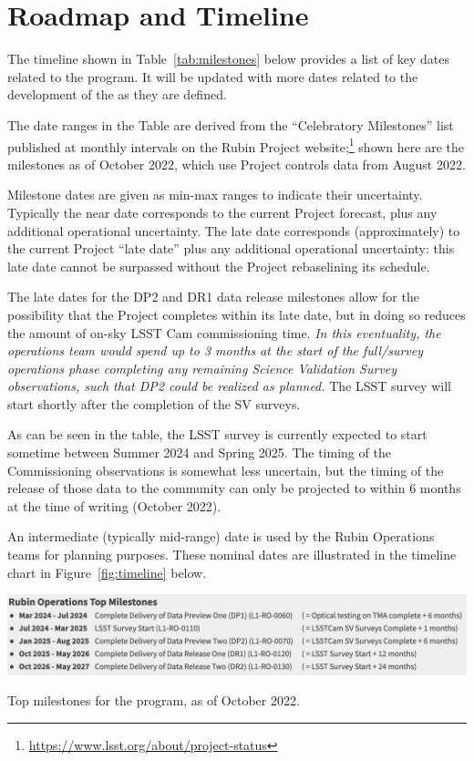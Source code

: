 \section{Roadmap and Timeline} \label{sec:timeline}

The timeline shown in Table~\ref{tab:milestones} below provides a list of key dates related to the \es program.
It will be updated with more dates related to the development of the \esp as they are defined.

The date ranges in the Table are derived from the ``Celebratory Milestones'' list published at monthly intervals on the Rubin Project website;\footnote{\url{https://www.lsst.org/about/project-status}} shown here are the milestones as of October 2022, which use Project controls data from August 2022.

Milestone dates are given as min-max ranges to indicate their uncertainty.
Typically the near date corresponds to the current Project forecast, plus any additional operational uncertainty.
The late date corresponds (approximately) to the current Project ``late date'' plus any additional operational uncertainty: this late date cannot be surpassed without the Project rebaselining its schedule.

The late dates for the DP2 and DR1 data release milestones allow for the possibility that the Project completes within its late date, but in doing so reduces the amount of on-sky LSST Cam commissioning time.
{\it In this eventuality, the operations team would spend up to 3 months at the start of the full/survey operations phase completing any remaining Science Validation Survey observations, such that DP2 could be realized as planned.}
The LSST survey will start shortly after the completion of the SV surveys.

As can be seen in the table, the LSST survey is currently expected to start sometime between Summer 2024 and Spring 2025.
The timing of the Commissioning observations is somewhat less uncertain, but the timing of the release of those data to the community can only be projected to within 6 months at the time of writing (October 2022).

An intermediate (typically mid-range) date is used by the Rubin Operations teams for planning purposes. These nominal dates are illustrated in the timeline chart in Figure~\ref{fig:timeline} below.

\begin{table}
\label{tab:milestones}
\includegraphics[width=\linewidth]{figures/DPR-milestones}
\caption{Top milestones for the \es program, as of October 2022.}
\end{table}

